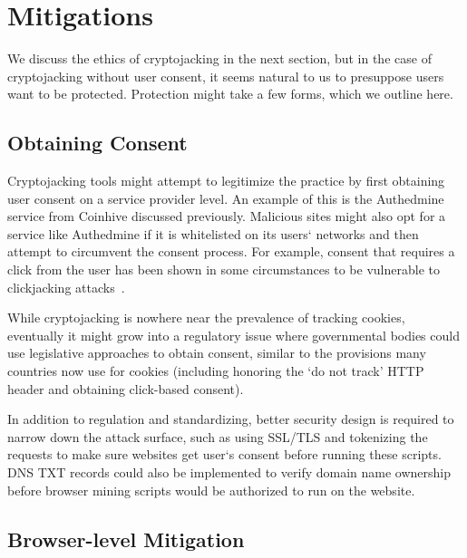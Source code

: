 
\section{Mitigations}\label{sec:mitigations}

We discuss the ethics of cryptojacking in the next section, but in the case of cryptojacking without user consent, it seems natural to us to presuppose users want to be protected. Protection might take a few forms, which we outline here.

\subsection{Obtaining Consent}

Cryptojacking tools might attempt to legitimize the practice by first obtaining user consent on a service provider level. An example of this is the Authedmine service from Coinhive discussed previously. Malicious sites might also opt for a service like Authedmine if it is whitelisted on its users` networks and then attempt to circumvent the consent process. For example, consent that requires a click from the user has been shown in some circumstances to be vulnerable to clickjacking attacks~\cite{rydstedt2010busting}.

While cryptojacking is nowhere near the prevalence of tracking cookies, eventually it might grow into a regulatory issue where governmental bodies could use legislative approaches to obtain consent, similar to the provisions many countries now use for cookies (including honoring the `do not track' HTTP header and obtaining click-based consent).

In addition to regulation and standardizing, better security design is required to narrow down the attack surface, such as using SSL/TLS and tokenizing the requests to make sure websites get user`s consent before running these scripts. DNS TXT records could also be implemented to verify domain name ownership before browser mining scripts would be authorized to run on the website.

\subsection{Browser-level Mitigation}

